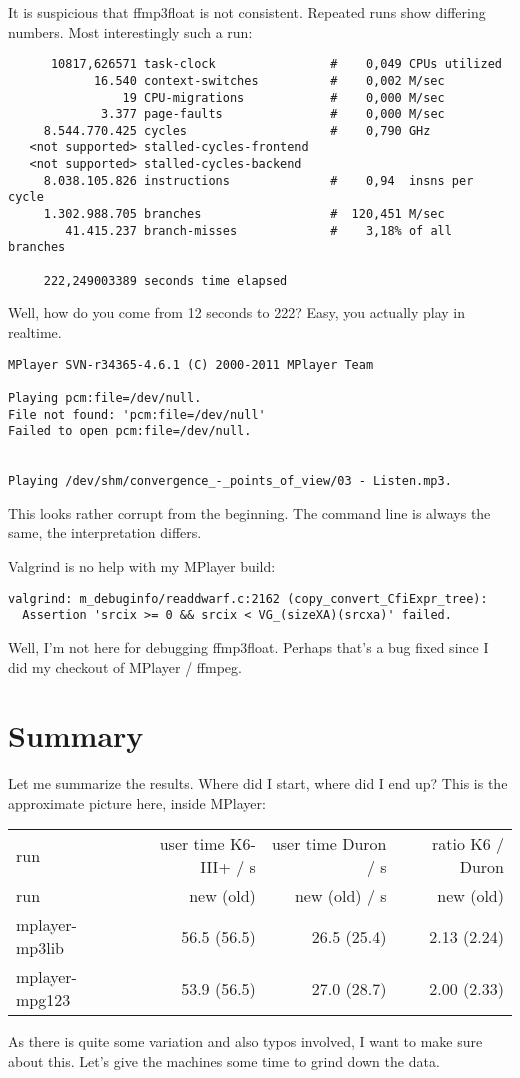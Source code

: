 \documentclass[a4paper,12pt]{scrartcl}
\begin{document}
It is suspicious that ffmp3float is not consistent. Repeated runs show differing numbers. Most interestingly such a run:
\begin{verbatim}
      10817,626571 task-clock                #    0,049 CPUs utilized          
            16.540 context-switches          #    0,002 M/sec                  
                19 CPU-migrations            #    0,000 M/sec                  
             3.377 page-faults               #    0,000 M/sec                  
     8.544.770.425 cycles                    #    0,790 GHz                    
   <not supported> stalled-cycles-frontend 
   <not supported> stalled-cycles-backend  
     8.038.105.826 instructions              #    0,94  insns per cycle        
     1.302.988.705 branches                  #  120,451 M/sec                  
        41.415.237 branch-misses             #    3,18% of all branches        

     222,249003389 seconds time elapsed
\end{verbatim}
Well, how do you come from 12 seconds to 222? Easy, you actually play in realtime.
\begin{verbatim}
MPlayer SVN-r34365-4.6.1 (C) 2000-2011 MPlayer Team

Playing pcm:file=/dev/null.
File not found: 'pcm:file=/dev/null'
Failed to open pcm:file=/dev/null.


Playing /dev/shm/convergence_-_points_of_view/03 - Listen.mp3.
\end{verbatim}
This looks rather corrupt from the beginning. The command line is always the same, the interpretation differs.

Valgrind is no help with my MPlayer build:
\begin{verbatim}
valgrind: m_debuginfo/readdwarf.c:2162 (copy_convert_CfiExpr_tree):
  Assertion 'srcix >= 0 && srcix < VG_(sizeXA)(srcxa)' failed.
\end{verbatim}
Well, I'm not here for debugging ffmp3float. Perhaps that's a bug fixed since I did my checkout of MPlayer / ffmpeg.

\section{Summary}

Let me summarize the results. Where did I start, where did I end up? This is the approximate picture here, inside MPlayer:

\begin{center}
\begin{tabular}{lrrr}
run & user time K6-III+ / s & user time Duron / s & ratio K6 / Duron \\
run & new (old) & new (old) / s & new (old) \\
\hline
mplayer-mp3lib & 56.5 (56.5) & 26.5 (25.4) & 2.13 (2.24) \\
mplayer-mpg123 & 53.9 (56.5) & 27.0 (28.7) & 2.00 (2.33)
\end{tabular}
\end{center}
As there is quite some variation and also typos involved, I want to make sure about this. Let's give the machines some time to grind down the data.
\end{document}
